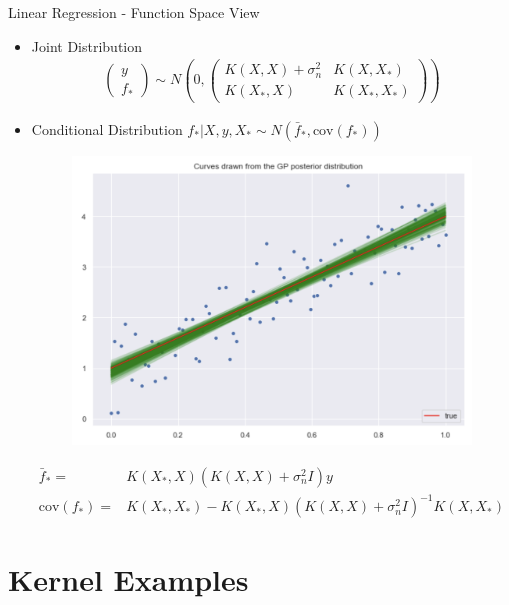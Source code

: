 \documentclass[10pt]{beamer}
\begin{document}
\begin{frame}{Linear Regression - Function Space View}{\cite[Chapter 2.2]{RW05}}
\begin{itemize}
\item Joint Distribution
\begin{align*}
\left(
\begin{array}{c}
y \\
f_*
\end{array}
\right)
\sim
N\left(0, 
\left(
\begin{array}{cc}
K(X,X)+\sigma_n^2 & K(X,X_*) \\
K(X_*,X) & K(X_*,X_*)
\end{array}
\right)
\right)
\end{align*}
\pause
\item Conditional Distribution $f_* | X, y, X_*\sim N(\bar{f}_*, \text{cov}(f_*))$
\begin{center}
\begin{figure}
\includegraphics[scale=0.15]{images/gp_lin_posterior.png} 
\end{figure}
\end{center}
\begin{align*}
\bar{f}_* =& K(X_*,X)(K(X,X) + \sigma_n^2 I)y \\
 \text{cov}(f_*) =& K(X_*,X_*) - K(X_*,X)(K(X,X) + \sigma_n^2I)^{-1}K(X,X_*)
\end{align*}
\end{itemize}
\end{frame}


\section{Kernel Examples}
\end{document}
